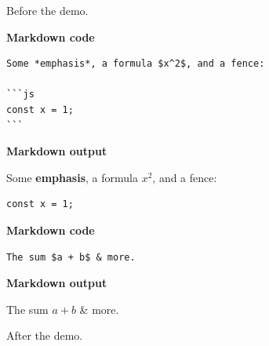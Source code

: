 Before the demo.

\par\medskip\noindent\textbf{Markdown code}\par\nopagebreak
\begin{verbatim}
Some *emphasis*, a formula $x^2$, and a fence:

```js
const x = 1;
```
\end{verbatim}

\noindent\textbf{Markdown output}\par\nopagebreak
Some \textbf{emphasis}, a formula $x^2$, and a fence:

\begin{verbatim}
const x = 1;
\end{verbatim}
\par\medskip

\par\medskip\noindent\textbf{Markdown code}\par\nopagebreak
\begin{verbatim}
The sum $a + b$ & more.
\end{verbatim}

\noindent\textbf{Markdown output}\par\nopagebreak
The sum $a + b$ \& more.
\par\medskip

After the demo.

